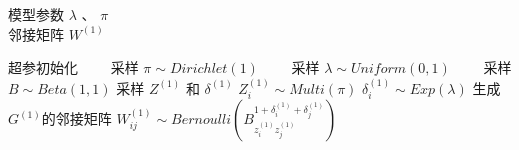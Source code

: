 



\begin{algorithm}[H]
\caption{$t=1$}\label {gent1}
\algorithmicrequire \; 模型参数 $\lambda$ 、 $\pi$ \\
\algorithmicensure \; 邻接矩阵 $W^{(1)}$
\begin{algorithmic}[1]
\STATE 超参初始化
\STATE ~~~~采样 $\pi \sim Dirichlet (1)$ 
\STATE ~~~~采样 $\lambda \sim Uniform(0,1)$
\STATE ~~~~采样 $B \sim Beta(1,1)$
\STATE 采样 $Z^{(1)}$ 和 $\delta^{(1)}$
\STATE $Z_i^{(1)} \sim Multi(\pi)$
\STATE $\delta^{(1)}_i \sim Exp(\lambda)$
\ENDFOR
\STATE 生成$G^{(1)}$的邻接矩阵
\STATE $W^{(1)}_{ij} \sim Bernoulli(B_{z_i^{(1)} z_j^{(1)}}^{1+\delta_i^{(1)} + \delta_j^{(1)}})$
\ENDFOR
\end{algorithmic}
\end{algorithm}

